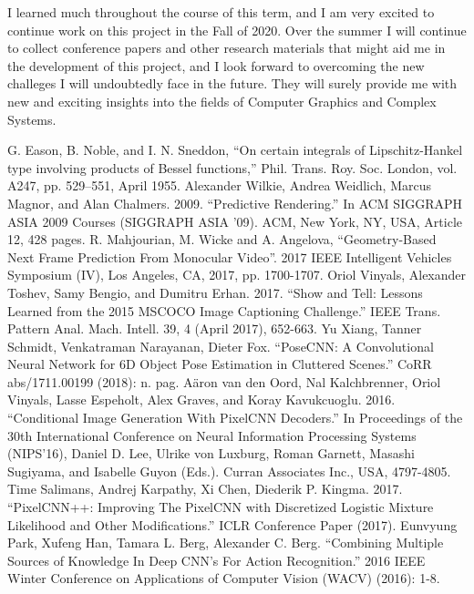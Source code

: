 \documentclass[conference]{IEEEtran}
\begin{document}
I learned much throughout the course of this term, and I am very excited
to continue work on this project in the Fall of 2020. Over the summer I will continue to
collect conference papers and other research materials that might aid me in the
development of this project, and I look forward to overcoming the new challeges I will
undoubtedly face in the future. They will surely provide me with new and
exciting insights
into the fields of Computer Graphics and Complex Systems.

\begin{thebibliography}{15}
 G. Eason, B. Noble, and I. N. Sneddon, ``On certain integrals of Lipschitz-Hankel type involving products of Bessel functions,'' Phil. Trans. Roy. Soc. London, vol. A247, pp. 529--551, April 1955.
 Alexander Wilkie, Andrea Weidlich, Marcus Magnor, and Alan Chalmers. 2009. ``Predictive Rendering.'' In ACM SIGGRAPH ASIA 2009 Courses (SIGGRAPH ASIA '09). ACM, New York, NY, USA, Article 12, 428 pages.
 R. Mahjourian, M. Wicke and A. Angelova, ``Geometry-Based Next Frame Prediction From Monocular Video''. 2017 IEEE Intelligent Vehicles Symposium (IV), Los Angeles, CA, 2017, pp. 1700-1707.
 Oriol Vinyals, Alexander Toshev, Samy Bengio, and Dumitru Erhan. 2017. ``Show and Tell: Lessons Learned from the 2015 MSCOCO Image Captioning Challenge.'' IEEE Trans. Pattern Anal. Mach. Intell. 39, 4 (April 2017), 652-663.
 Yu Xiang, Tanner Schmidt, Venkatraman Narayanan, Dieter Fox. ``PoseCNN: A Convolutional Neural Network for 6D Object Pose Estimation in Cluttered Scenes.'' CoRR abs/1711.00199 (2018): n. pag.
 A\"{a}ron van den Oord, Nal Kalchbrenner, Oriol Vinyals, Lasse Espeholt, Alex Graves, and Koray Kavukcuoglu. 2016. ``Conditional Image Generation With PixelCNN Decoders.'' In Proceedings of the 30th International Conference on Neural Information Processing Systems (NIPS'16), Daniel D. Lee, Ulrike von Luxburg, Roman Garnett, Masashi Sugiyama, and Isabelle Guyon (Eds.). Curran Associates Inc., USA, 4797-4805.
 Time Salimans, Andrej Karpathy, Xi Chen, Diederik P. Kingma. 2017. ``PixelCNN++: Improving The PixelCNN with Discretized Logistic Mixture Likelihood and Other Modifications.'' ICLR Conference Paper (2017).
 Eunvyung Park, Xufeng Han, Tamara L. Berg, Alexander C. Berg. ``Combining Multiple Sources of Knowledge In Deep CNN's For Action Recognition.'' 2016 IEEE Winter Conference on Applications of Computer Vision (WACV) (2016): 1-8.

\end{thebibliography}
\end{document}
